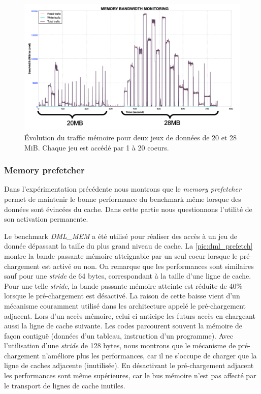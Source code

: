         \begin{figure}
        \center
        \includegraphics[width=14cm]{images/dml_bw_cacheL3.png}
        \caption{\label{pic:dml_bw_cacheL3} Évolution du traffic mémoire pour deux jeux de données de 20 et 28 MiB. Chaque jeu est accédé par 1 à 20 coeurs.}
        \end{figure}
        
        

    \subsubsection{Memory prefetcher}
        
        Dans l'expérimentation précédente nous montrons que le \textit{memory prefetcher} permet de maintenir le bonne performance du benchmark même lorsque des données sont évincées du cache. Dans cette partie nous questionnons l'utilité de son activation permanente. 
        
        Le benchmark \textit{DML\_MEM} a été utilisé pour réaliser des accès à un jeu de donnée dépassant la taille du plus grand niveau de cache. La \autoref{pic:dml_prefetch} montre la bande passante mémoire atteignable par un seul coeur lorsque le pré-chargement est activé ou non. On remarque que les performances sont similaires sauf pour une \textit{stride} de 64 bytes, correspondant à la taille d'une ligne de cache. Pour une telle \textit{stride}, la bande passante mémoire atteinte est réduite de 40\% lorsque le pré-chargement est désactivé.
        La raison de cette baisse vient d'un mécanisme couramment utilisé dans les architecture appelé le pré-chargement adjacent. Lors d'un accès mémoire, celui ci anticipe les futurs accès en chargeant aussi la ligne de cache suivante. Les codes parcourent souvent la mémoire de façon contiguë (données d'un tableau, instruction d'un programme). Avec l'utilisation d'une \textit{stride} de 128 bytes, nous montrons que le mécanisme de pré-chargement n'améliore plus les performances, car il ne s'occupe de charger que la ligne de caches adjacente (inutilisée). En désactivant le pré-chargement adjacent les performances sont même supérieures, car le bus mémoire n'est pas affecté par le transport de lignes de cache inutiles.
        
